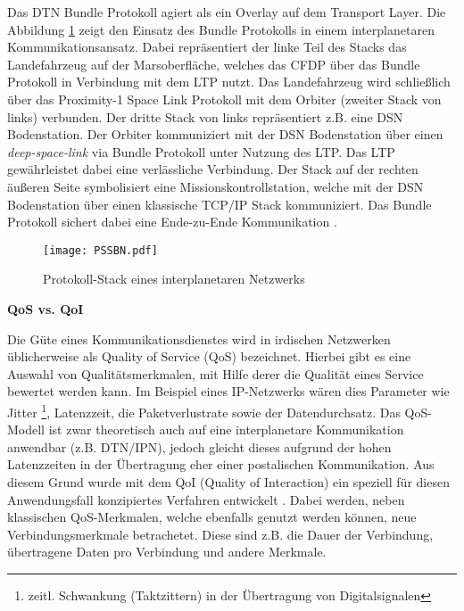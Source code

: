 Das \gls{DTN} Bundle Protokoll agiert als ein Overlay auf dem Transport Layer. Die
Abbildung \ref{fig:PSSBN} zeigt den Einsatz des Bundle Protokolls in einem
interplanetaren Kommunikationsansatz.
Dabei repr{\"a}sentiert der linke Teil des Stacks das Landefahrzeug auf der
Marsoberfl{\"a}che, welches das \gls{CFDP} {\"u}ber das Bundle Protokoll in
Verbindung mit dem \gls{LTP} nutzt.
Das Landefahrzeug wird schlie{\ss}lich {\"u}ber das Proximity-1 Space Link
Protokoll mit dem Orbiter (zweiter Stack von links) verbunden. Der dritte Stack
von links repr{\"a}sentiert z.B. eine \gls{DSN} Bodenstation. Der
Orbiter kommuniziert mit der \gls{DSN} Bodenstation {\"u}ber einen
\textit{deep-space-link} via Bundle Protokoll unter Nutzung des \gls{LTP}. Das
\gls{LTP} gew{\"a}hrleistet dabei eine verl{\"a}ssliche Verbindung. Der Stack
auf der rechten {\"a}u{\ss}eren Seite symbolisiert eine Missionskontrollstation,
welche mit der \gls{DSN} Bodenstation {\"u}ber einen klassische
\gls{TCP}/\gls{IP} Stack kommuniziert. Das Bundle Protokoll sichert dabei eine
Ende-zu-Ende Kommunikation \cite{DTNBundle}.

\begin{figure}[H]
\centering
\texttt{[image: PSSBN.pdf]}
\caption[Protokoll-Stack eines interplanetaren Netzwerks]
{Protokoll-Stack eines interplanetaren Netzwerks \cite{DTNBundle}}
\label{fig:PSSBN}
\end{figure}

\textbf{\gls{QoS} vs. \gls{QoI}}

Die G{\"u}te eines Kommunikationsdienstes wird in irdischen Netzwerken
{\"u}blicherweise als Quality of Service (QoS) bezeichnet. Hierbei gibt es eine
Auswahl von Qualit{\"a}tsmerkmalen, mit Hilfe derer die Qualit{\"a}t eines
Service bewertet werden kann. Im Beispiel eines IP-Netzwerks w{\"a}ren dies
Parameter wie Jitter \footnote{zeitl. Schwankung (Taktzittern) in der
{\"U}bertragung von Digitalsignalen}, Latenzzeit, die Paketverlustrate sowie der Datendurchsatz.
Das QoS-Modell ist zwar theoretisch auch auf eine interplanetare Kommunikation
anwendbar (z.B. DTN/IPN), jedoch gleicht dieses aufgrund der hohen Latenzzeiten
in der {\"U}bertragung eher einer postalischen Kommunikation. Aus diesem Grund
wurde mit dem QoI (Quality of Interaction) ein speziell f{\"u}r diesen
Anwendungsfall konzipiertes Verfahren entwickelt \cite{Daher2}. Dabei
werden, neben klassischen QoS-Merkmalen, welche ebenfalls genutzt werden
k{\"o}nnen, neue Verbindungsmerkmale betrachetet. Diese sind z.B. die
Dauer der Verbindung, {\"u}bertragene Daten pro Verbindung und andere Merkmale. 

